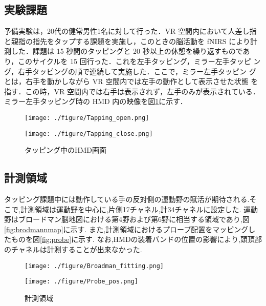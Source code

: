 \subsection{実験課題}

予備実験は，20代の健常男性1名に対して行った．VR 空間内において人差し指
と親指の指先をタップする課題を実施し，このときの脳活動を fNIRS により計
測した．課題は 15 秒間のタッピングと 20 秒以上の休憩を繰り返すものであ
り，このサイクルを 15 回行った．これを左手タッピング，ミラー左手タッピ
ング，右手タッピングの順で連続して実施した．ここで，ミラー左手タッピン
グとは，右手を動かしながら VR 空間内では左手の動作として表示させた状態
を指す．この時，VR 空間内では右手は表示されず，左手のみが表示されている．
ミラー左手タッピング時の HMD 内の映像を図\ref{fig:mirrortask}に示す．

\begin{figure}[htb]
    \begin{minipage}{0.5\hsize}
        \texttt{[image: ./figure/Tapping\_open.png]}
    \end{minipage}
    \begin{minipage}{0.5\hsize}
        \texttt{[image: ./figure/Tapping\_close.png]}
    \end{minipage}
    \caption{タッピング中のHMD画面}
    \label{fig:mirrortask}
\end{figure}

\subsection{計測領域}

タッピング課題中には動作している手の反対側の運動野の賦活が期待される\cite{Khan}\cite{Rahimpour}.そこで,計測領域は運動野を中心に,片側17チャネル,計34チャネルに設定した.
運動野はブロードマン脳地図における第4野および第6野に相当する領域であり,図\ref{fig:brodmannmap}に示す.
また,計測領域におけるプローブ配置をマッピングしたものを図\ref{fig:probe}に示す.
なお,HMDの装着バンドの位置の影響により,頭頂部のチャネルは計測することが出来なかった.

\begin{figure}[htb]
    \centering
    \begin{minipage}{0.45\linewidth}
        \texttt{[image: ./figure/Broadman\_fitting.png]}
        \label{fig:brodmannmap}
    \end{minipage}
    \begin{minipage}{0.45\linewidth}
        \texttt{[image: ./figure/Probe\_pos.png]}
        \label{fig:probe}
    \end{minipage}

    \caption{計測領域}
    \label{fig:measurementarea}
\end{figure}

